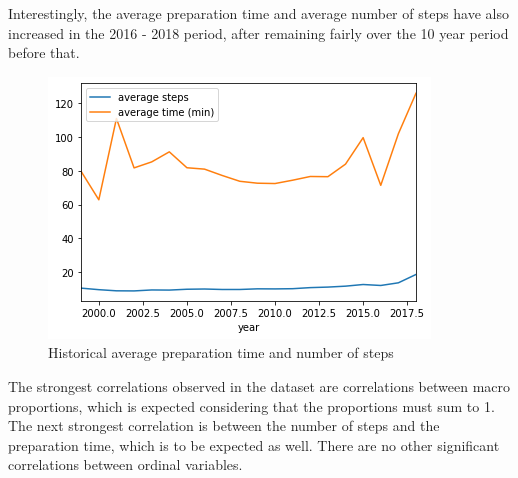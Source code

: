 \documentclass[sigconf]{acmart}
\begin{document}
Interestingly, the average preparation time and average number of steps have also increased in the 2016 - 2018 period, after remaining fairly over the 10 year period before that. 

\begin{figure}[h]
  \centering
  \includegraphics[width=\linewidth]{steps time over time.png}
  \caption{Historical average preparation time and number of steps}
\end{figure}

The strongest correlations observed in the dataset are correlations between macro proportions, which is expected considering that the proportions must sum to 1. The next strongest correlation is between the number of steps and the preparation time, which is to be expected as well. There are no other significant correlations between ordinal variables. 
\end{document}
